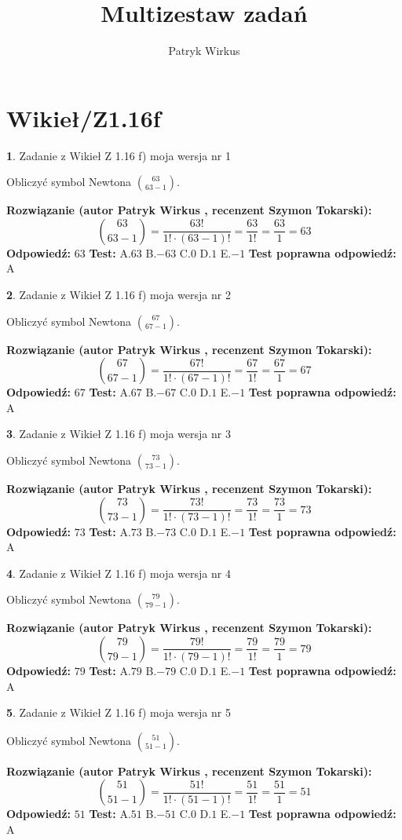 \documentclass[12pt, a4paper]{article}
\title{Multizestaw zadań}
\author{Patryk Wirkus}
\date{}
\theoremstyle{definition} %
\newtheorem{zad}{}
\newcommand{\kategoria}[1]{\section{#1}}
\newcommand{\zadStart}[1]{\begin{zad}#1\newline}
\newcommand{\zadStop}{\end{zad}}
\newcommand{\rozwStart}[2]{\noindent \textbf{Rozwiązanie (autor #1 , recenzent #2): }\newline}
\newcommand{\rozwStop}{\newline}
\newcommand{\odpStart}{\noindent \textbf{Odpowiedź:}\newline}
\newcommand{\odpStop}{\newline}
\newcommand{\testStart}{\noindent \textbf{Test:}\newline}
\newcommand{\testStop}{\newline}
\newcommand{\kluczStart}{\noindent \textbf{Test poprawna odpowiedź:}\newline}
\newcommand{\kluczStop}{\newline}
\begin{document}
\maketitle

\kategoria{Wikieł/Z1.16f}


\zadStart{Zadanie z Wikieł Z 1.16 f) moja wersja nr 1}

Obliczyć symbol Newtona ${63 \choose 63-1}$.
\zadStop
\rozwStart{Patryk Wirkus}{Szymon Tokarski}
$${63 \choose 63-1} = \frac{63!}{1! \cdot (63-1)!} = \frac{63}{1!} = \frac{63}{1} = 63$$
\rozwStop
\odpStart
$63$
\odpStop
\testStart
A.$63$ B.$-63$ C.$0$ D.$1$ E.$-1$
\testStop
\kluczStart
A
\kluczStop



\zadStart{Zadanie z Wikieł Z 1.16 f) moja wersja nr 2}

Obliczyć symbol Newtona ${67 \choose 67-1}$.
\zadStop
\rozwStart{Patryk Wirkus}{Szymon Tokarski}
$${67 \choose 67-1} = \frac{67!}{1! \cdot (67-1)!} = \frac{67}{1!} = \frac{67}{1} = 67$$
\rozwStop
\odpStart
$67$
\odpStop
\testStart
A.$67$ B.$-67$ C.$0$ D.$1$ E.$-1$
\testStop
\kluczStart
A
\kluczStop



\zadStart{Zadanie z Wikieł Z 1.16 f) moja wersja nr 3}

Obliczyć symbol Newtona ${73 \choose 73-1}$.
\zadStop
\rozwStart{Patryk Wirkus}{Szymon Tokarski}
$${73 \choose 73-1} = \frac{73!}{1! \cdot (73-1)!} = \frac{73}{1!} = \frac{73}{1} = 73$$
\rozwStop
\odpStart
$73$
\odpStop
\testStart
A.$73$ B.$-73$ C.$0$ D.$1$ E.$-1$
\testStop
\kluczStart
A
\kluczStop



\zadStart{Zadanie z Wikieł Z 1.16 f) moja wersja nr 4}

Obliczyć symbol Newtona ${79 \choose 79-1}$.
\zadStop
\rozwStart{Patryk Wirkus}{Szymon Tokarski}
$${79 \choose 79-1} = \frac{79!}{1! \cdot (79-1)!} = \frac{79}{1!} = \frac{79}{1} = 79$$
\rozwStop
\odpStart
$79$
\odpStop
\testStart
A.$79$ B.$-79$ C.$0$ D.$1$ E.$-1$
\testStop
\kluczStart
A
\kluczStop



\zadStart{Zadanie z Wikieł Z 1.16 f) moja wersja nr 5}

Obliczyć symbol Newtona ${51 \choose 51-1}$.
\zadStop
\rozwStart{Patryk Wirkus}{Szymon Tokarski}
$${51 \choose 51-1} = \frac{51!}{1! \cdot (51-1)!} = \frac{51}{1!} = \frac{51}{1} = 51$$
\rozwStop
\odpStart
$51$
\odpStop
\testStart
A.$51$ B.$-51$ C.$0$ D.$1$ E.$-1$
\testStop
\kluczStart
A
\kluczStop
\end{document}
